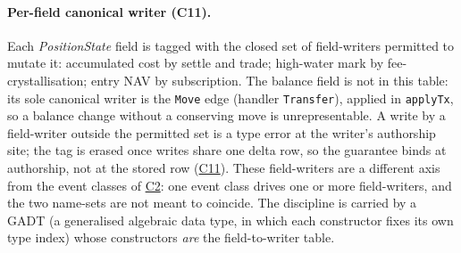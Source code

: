 \paragraph{Per-field canonical writer (C11).}
Each \emph{PositionState} field is tagged with the closed set of field-writers permitted to
mutate it: accumulated cost by settle and trade; high-water mark by fee-crystallisation;
entry NAV by subscription. The balance field is not in this table: its sole canonical writer
is the \texttt{Move} edge (handler \texttt{Transfer}), applied in \texttt{applyTx}, so a
balance change without a conserving move is unrepresentable. A write by a field-writer
outside the permitted set
is a type error at the writer's authorship site; the tag is erased once writes share one
delta row, so the guarantee binds at authorship, not at the stored row
(\hyperref[cond:C11]{C11}). These field-writers are a different axis from the event classes
of \hyperref[cond:C2]{C2}: one event class drives one or more field-writers, and the two
name-sets are not meant to coincide. The discipline is carried by a GADT (a generalised
algebraic data type, in which each constructor fixes its own type index) whose
constructors \emph{are} the field-to-writer table.


